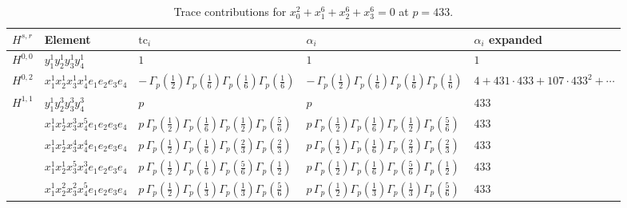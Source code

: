 \documentclass[11pt]{article}
\begin{document}
\begin{table}[ht]
\centering
\caption{Trace contributions for $x_0^{2} + x_1^{6} + x_2^{6} + x_3^{6} = 0$ at $p=433$.}\label{tab:diagonal-13}
\renewcommand{\arraystretch}{1.1}
{\scriptsize
\begin{tabular}{@{}lllll@{}}
\toprule
$H^{s,r}$ & Element & $\mathrm{tc}_i$ & $\alpha_i$ & $\alpha_i$ expanded \\
\midrule
$H^{0,0}$ & $y_{1}^{1} y_{2}^{1} y_{3}^{1} y_{4}^{1}$ & $1$ & $1$ & $1$ \\
\midrule
$H^{0,2}$ & $x_{1}^{1} x_{2}^{1} x_{3}^{1} x_{4}^{1}  e_{1} e_{2} e_{3} e_{4}$ & $- \, \Gamma_p \left( \frac{1}{2} \right) \Gamma_p \left( \frac{1}{6} \right) \Gamma_p \left( \frac{1}{6} \right) \Gamma_p \left( \frac{1}{6} \right)$ & $- \, \Gamma_p \left( \frac{1}{2} \right) \Gamma_p \left( \frac{1}{6} \right) \Gamma_p \left( \frac{1}{6} \right) \Gamma_p \left( \frac{1}{6} \right)$ & $4{+}431{\cdot}433{+}107{\cdot}433^{2}{+}\cdots$ \\
\midrule
$H^{1,1}$ & $y_{1}^{1} y_{2}^{3} y_{3}^{3} y_{4}^{3}$ & $p \,$ & $p \,$ & $433$ \\
 & $x_{1}^{1} x_{2}^{1} x_{3}^{3} x_{4}^{5}  e_{1} e_{2} e_{3} e_{4}$ & $p \, \Gamma_p \left( \frac{1}{2} \right) \Gamma_p \left( \frac{1}{6} \right) \Gamma_p \left( \frac{1}{2} \right) \Gamma_p \left( \frac{5}{6} \right)$ & $p \, \Gamma_p \left( \frac{1}{2} \right) \Gamma_p \left( \frac{1}{6} \right) \Gamma_p \left( \frac{1}{2} \right) \Gamma_p \left( \frac{5}{6} \right)$ & $433$ \\
 & $x_{1}^{1} x_{2}^{1} x_{3}^{4} x_{4}^{4}  e_{1} e_{2} e_{3} e_{4}$ & $p \, \Gamma_p \left( \frac{1}{2} \right) \Gamma_p \left( \frac{1}{6} \right) \Gamma_p \left( \frac{2}{3} \right) \Gamma_p \left( \frac{2}{3} \right)$ & $p \, \Gamma_p \left( \frac{1}{2} \right) \Gamma_p \left( \frac{1}{6} \right) \Gamma_p \left( \frac{2}{3} \right) \Gamma_p \left( \frac{2}{3} \right)$ & $433$ \\
 & $x_{1}^{1} x_{2}^{1} x_{3}^{5} x_{4}^{3}  e_{1} e_{2} e_{3} e_{4}$ & $p \, \Gamma_p \left( \frac{1}{2} \right) \Gamma_p \left( \frac{1}{6} \right) \Gamma_p \left( \frac{5}{6} \right) \Gamma_p \left( \frac{1}{2} \right)$ & $p \, \Gamma_p \left( \frac{1}{2} \right) \Gamma_p \left( \frac{1}{6} \right) \Gamma_p \left( \frac{5}{6} \right) \Gamma_p \left( \frac{1}{2} \right)$ & $433$ \\
 & $x_{1}^{1} x_{2}^{2} x_{3}^{2} x_{4}^{5}  e_{1} e_{2} e_{3} e_{4}$ & $p \, \Gamma_p \left( \frac{1}{2} \right) \Gamma_p \left( \frac{1}{3} \right) \Gamma_p \left( \frac{1}{3} \right) \Gamma_p \left( \frac{5}{6} \right)$ & $p \, \Gamma_p \left( \frac{1}{2} \right) \Gamma_p \left( \frac{1}{3} \right) \Gamma_p \left( \frac{1}{3} \right) \Gamma_p \left( \frac{5}{6} \right)$ & $433$ \\

\end{tabular}}
\end{table}
\end{document}
